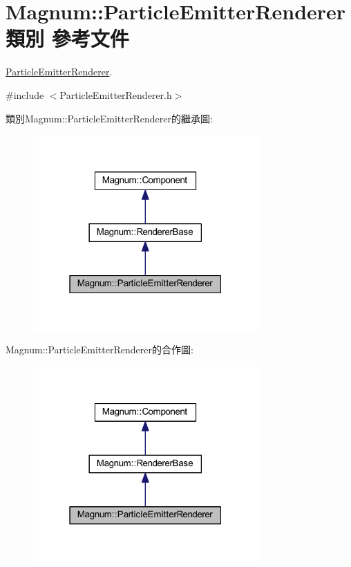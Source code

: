 \hypertarget{class_magnum_1_1_particle_emitter_renderer}{}\section{Magnum\+:\+:Particle\+Emitter\+Renderer 類別 參考文件}
\label{class_magnum_1_1_particle_emitter_renderer}


\hyperlink{class_magnum_1_1_particle_emitter_renderer}{Particle\+Emitter\+Renderer}.  




{\ttfamily \#include $<$Particle\+Emitter\+Renderer.\+h$>$}



類別\+Magnum\+:\+:Particle\+Emitter\+Renderer的繼承圖\+:\nopagebreak
\begin{figure}[H]
\begin{center}
\leavevmode
\includegraphics[width=244pt]{class_magnum_1_1_particle_emitter_renderer__inherit__graph}
\end{center}
\end{figure}


Magnum\+:\+:Particle\+Emitter\+Renderer的合作圖\+:\nopagebreak
\begin{figure}[H]
\begin{center}
\leavevmode
\includegraphics[width=244pt]{class_magnum_1_1_particle_emitter_renderer__coll__graph}
\end{center}
\end{figure}
